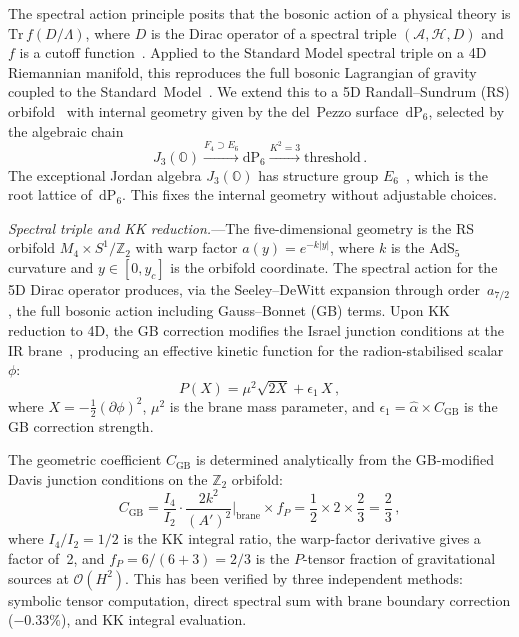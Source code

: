 \documentclass[aps,prl,twocolumn,superscriptaddress]{revtex4-2}
\newcommand{\CGB}{C_{\mathrm{GB}}}
\newcommand{\eps}{\epsilon_1}
\newcommand{\ahat}{\hat{\alpha}}
\newcommand{\dP}{\mathrm{dP}_6}
\begin{document}
The spectral action principle posits that the bosonic action of a physical
theory is $\mathrm{Tr}\, f(D/\Lambda)$, where $D$ is the Dirac operator of
a spectral triple $(\mathcal{A}, \mathcal{H}, D)$ and $f$ is a cutoff
function~\cite{CC1997}.  Applied to the Standard Model spectral triple on a
4D Riemannian manifold, this reproduces the full bosonic Lagrangian of gravity
coupled to the Standard~Model~\cite{CCM2007,CC2012}.  We extend this to a
5D Randall--Sundrum (RS) orbifold~\cite{RS1999} with internal geometry given
by the del~Pezzo surface~$\dP$, selected by the algebraic chain
\begin{equation}
  J_3(\mathbb{O}) \xrightarrow{F_4 \supset E_6}
  \dP \xrightarrow{K^2 = 3}
  \text{threshold}\,.
  \label{eq:chain}
\end{equation}
The exceptional Jordan algebra $J_3(\mathbb{O})$ has structure group
$E_6$~\cite{Freudenthal1954,Tits1966}, which is the root lattice of~$\dP$.
This fixes the internal geometry without adjustable choices.



\textit{Spectral triple and KK reduction.}---The
five-dimensional geometry is the RS orbifold
$M_4 \times S^1/\mathbb{Z}_2$ with warp factor
$a(y) = e^{-k|y|}$, where $k$ is the AdS$_5$ curvature and $y \in [0, y_c]$
is the orbifold coordinate.  The spectral action for the 5D Dirac operator
produces, via the Seeley--DeWitt expansion through order~$a_{7/2}$, the full
bosonic action including Gauss--Bonnet (GB) terms.  Upon KK reduction to 4D,
the GB correction modifies the Israel junction conditions at the IR
brane~\cite{Davis2003}, producing an effective kinetic function for the
radion-stabilised scalar~$\phi$:
\begin{equation}
  P(X) = \mu^2 \sqrt{2X} + \eps\, X\,,
  \label{eq:kinetic}
\end{equation}
where $X = -\frac{1}{2}(\partial\phi)^2$, $\mu^2$ is the brane mass
parameter, and $\eps = \ahat \times \CGB$ is the GB correction strength.

The geometric coefficient $\CGB$ is determined analytically from the
GB-modified Davis junction conditions on the $\mathbb{Z}_2$ orbifold:
\begin{equation}
  \CGB = \frac{I_4}{I_2} \cdot \frac{2k^2}{(A')^2}\bigg|_{\mathrm{brane}}
  \times f_P = \frac{1}{2} \times 2 \times \frac{2}{3}
  = \frac{2}{3}\,,
  \label{eq:CGB}
\end{equation}
where $I_4/I_2 = 1/2$ is the KK integral ratio, the warp-factor derivative
gives a factor of~2, and $f_P = 6/(6+3) = 2/3$ is the $P$-tensor fraction of
gravitational sources at $\mathcal{O}(H^2)$.  This has been verified by three
independent methods: symbolic tensor computation, direct spectral sum with
brane boundary correction ($-0.33\%$), and KK integral evaluation.
\end{document}
